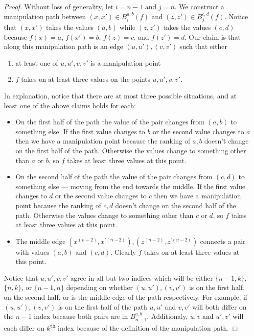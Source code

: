 	\begin{proof}
		Without loss of generality, let $i = n - 1$ and $j = n$. We construct a manipulation path between $(x, x') \in B_i^{a,b}(f)$ and $(z, z') \in B_j^{c,d}(f)$. Notice that $(x, x')$ takes the values $(a, b)$ while $(z, z')$ takes the values $(c, d)$ because $f(x) = a$, $f(x') = b$, $f(z) = c$, and $f(z') = d$. Our claim is that along this manipulation path is an edge $(u, u'), (v, v')$ such that either
		\begin{enumerate}
			\item at least one of $u, u', v, v'$ is a manipulation point
			\item $f$ takes on at least three values on the points $u, u', v, v'$.
		\end{enumerate}
		In explanation, notice that there are at most three possible situations, and at least one of the above claims holds for each:
		\begin{itemize}
			\item On the first half of the path the value of the pair changes from $(a, b)$ to something else. If the first value changes to $b$ or the second value changes to $a$ then we have a manipulation point because the ranking of $a, b$ doesn't change on the first half of the path. Otherwise the values change to something other than $a$ or $b$, so $f$ takes at least three values at this point.
			\item On the second half of the path the value of the pair changes from $(c, d)$ to something else --- moving from the end towards the middle. If the first value changes to $d$ or the second value changes to $c$ then we have a manipulation point because the ranking of $c, d$ doesn't change on the second half of the path. Otherwise the values change to something other than $c$ or $d$, so $f$ takes at least three values at this point.
			\item The middle edge $(x^{(n-2)}, x^{\prime(n-2)}), (z^{(n-2)}, z^{\prime(n-2)})$ connects a pair with values $(a, b)$ and $(c, d)$. Clearly $f$ takes on at least three values at this point.
		\end{itemize}

		Notice that $u, u', v, v'$ agree in all but two indices which will be either $\{n - 1, k\}$, $\{n, k\}$, or $\{n - 1, n\}$ depending on whether $(u, u'), (v, v')$ is on the first half, on the second half, or is the middle edge of the path respectively. For example, if $(u, u'), (v, v')$ is on the first half of the path $u, u'$ and $v, v'$ will both differ on the $n - 1$ index because both pairs are in $B^{a,b}_{n-1}$. Additionaly, $u, v$ and $u', v'$ will each differ on $k$\textsuperscript{th} index because of the definition of the manipulation path.


\end{proof}

